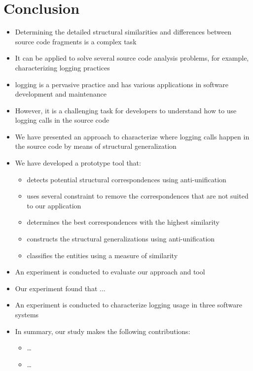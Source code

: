 \chapter{Conclusion}  \label{conc}
\begin{itemize} [leftmargin=.01in]
\item Determining the detailed structural similarities and differences between source code fragments is a complex task
\item It can be applied to solve several source code analysis problems, for example, characterizing logging practices
\item logging is a pervasive practice and has various applications in software development and maintenance
\item However, it is a challenging task for developers to understand how to use logging calls in the source code
\item We have presented an approach to characterize where logging calls happen in the source code by means of structural generalization
\item We have developed a prototype tool that:
\begin{itemize} [leftmargin=.3in]
\item detects potential structural correspondences using anti-unification
\item uses several constraint to remove the correspondences that are not suited to our application
\item determines the best correspondences with the highest similarity
\item constructs the structural generalizations using anti-unification
\item classifies the entities using a measure of similarity
\end{itemize}
\item An experiment is conducted to evaluate our approach and tool
\item Our experiment found that ...
\item An experiment is conducted to characterize logging usage in three software systems
\item In summary, our study makes the following contributions:
\begin{itemize} [leftmargin=.3in]
\item …
\item …
\end{itemize}


\end{itemize}
